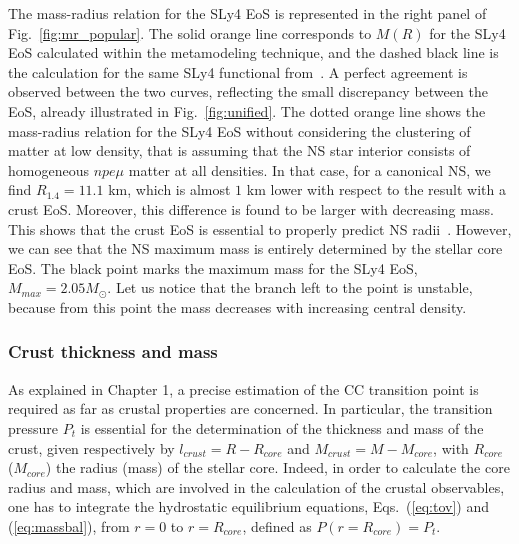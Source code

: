 The mass-radius relation for the SLy4 EoS is represented in the right panel of
Fig.~\ref{fig:mr_popular}. The solid orange line corresponds to $M(R)$ for the 
SLy4 EoS calculated within the metamodeling technique, and the dashed 
black line is the calculation for the same SLy4 functional
from~\cite{Douchin2001}. A perfect agreement is observed between the two 
curves, reflecting the small discrepancy between the EoS, already illustrated 
in Fig.~\ref{fig:unified}. 
The dotted orange line shows the mass-radius relation for the SLy4 EoS without
considering the clustering of matter at low density, that is assuming that the
NS star interior consists of homogeneous $npe\mu$ matter at all densities. In 
that case, for a canonical NS, we find $R_{1.4} = 11.1$ km, which is almost $1$ 
km lower with respect to the result with a crust EoS. 
Moreover, this difference is found to be larger with decreasing mass. 
This shows that the crust EoS is essential to properly predict NS
radii~\cite{Perot2020}. 
However, we can see that the NS maximum mass is entirely determined by the 
stellar core EoS.
The black point marks the maximum mass for the SLy4 EoS, $M_{max} = 
2.05M_\odot$. Let us notice that the branch left to the point is unstable, 
because from this point the mass decreases with increasing central density.

\subsubsection{Crust thickness and mass}\label{subsubsec:crustthickmass}
As explained in Chapter 1, a precise estimation of the CC transition point is
required as far as crustal properties are concerned. In particular, the
transition pressure $P_t$ is essential for the determination of the thickness 
and mass of the crust, given respectively by $l_{crust}=R-R_{core}$ and
$M_{crust}=M-M_{core}$, with $R_{core}$ ($M_{core}$) the radius
(mass) of the stellar core. Indeed, in order to calculate the core radius and
mass, which are involved in the calculation of the crustal observables, one has 
to integrate the hydrostatic equilibrium equations, Eqs.~(\ref{eq:tov}) and 
(\ref{eq:massbal}), from $r=0$ to $r=R_{core}$, defined as $P(r=R_{core})=P_t$.


